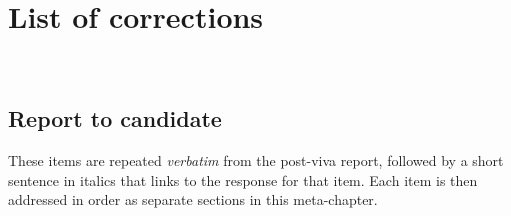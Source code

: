 \chapter*{List of  corrections}~\label{ch-list-of-corrections}

\section*{Report to candidate}
These items are repeated \emph{verbatim} from the post-viva report, followed by a short sentence in italics that links to the response for that item. Each item is then addressed in order as separate sections in this meta-chapter.


